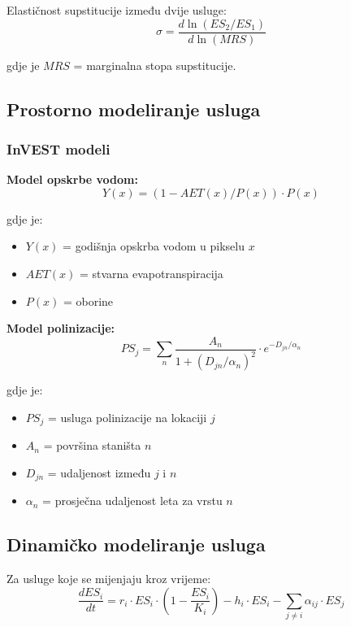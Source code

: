\documentclass[11pt,oneside]{book}
\begin{document}
Elastičnost supstitucije između dvije usluge:
\begin{equation}
	\sigma = \frac{d \ln(ES_2/ES_1)}{d \ln(MRS)}
\end{equation}

gdje je $MRS$ = marginalna stopa supstitucije.

\subsection{Prostorno modeliranje usluga}

\subsubsection{InVEST modeli}

\textbf{Model opskrbe vodom:}
\begin{equation}
	Y(x) = (1 - AET(x)/P(x)) \cdot P(x)
\end{equation}

gdje je:
\begin{itemize}
	\item $Y(x)$ = godišnja opskrba vodom u pikselu $x$
	\item $AET(x)$ = stvarna evapotranspiracija
	\item $P(x)$ = oborine
\end{itemize}

\textbf{Model polinizacije:}
\begin{equation}
	PS_j = \sum_{n} \frac{A_n}{1 + (D_{jn}/\alpha_n)^2} \cdot e^{-D_{jn}/\alpha_n}
\end{equation}

gdje je:
\begin{itemize}
	\item $PS_j$ = usluga polinizacije na lokaciji $j$
	\item $A_n$ = površina staništa $n$
	\item $D_{jn}$ = udaljenost između $j$ i $n$
	\item $\alpha_n$ = prosječna udaljenost leta za vrstu $n$
\end{itemize}

\subsection{Dinamičko modeliranje usluga}

Za usluge koje se mijenjaju kroz vrijeme:
\begin{equation}
	\frac{dES_i}{dt} = r_i \cdot ES_i \cdot \left(1 - \frac{ES_i}{K_i}\right) - h_i \cdot ES_i - \sum_{j \neq i} \alpha_{ij} \cdot ES_j
\end{equation}
\end{document}
